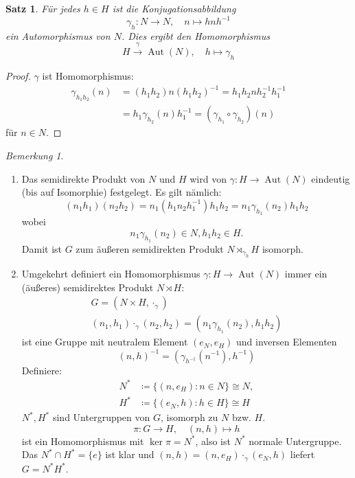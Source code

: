 \documentclass[12pt]{scrartcl} %
\DeclareMathOperator{\Aut}{Aut}
\newcommand{\inv}[1]{\left(#1\right)^{-1}}
\newcommand{\Inv}[1]{#1^{-1}}
\newtheorem{thm}{Satz}[section]
\theoremstyle{definition}
\theoremstyle{remark}
\newtheorem*{nb}{Bemerkung}
\begin{document}
\begin{thm}
	Für jedes $h\in H$ ist die Konjugationsabbildung $$\gamma_h: N\to N, \quad n\mapsto hn\Inv{h}$$ ein Automorphismus von $N$.
	Dies ergibt den Homomorphismus $$H\overset{\gamma}{\longrightarrow} \Aut(N), \quad h\mapsto \gamma_h$$
\end{thm}

\begin{proof}
	$\gamma$ ist Homomorphismus:
	\begin{align*}
		\gamma_{h_1h_2}(n)&=(h_1h_2)n\inv{h_1h_2}=h_1h_2n\Inv{h_2}\Inv{h_1} \\
		&= h_1\gamma_{h_2}(n)\Inv{h_1}=(\gamma_{h_1}\circ\gamma_{h_2})(n)
	\end{align*}
	für $n\in N$.
\end{proof}

\begin{nb}
	\begin{enumerate}[label=(\arabic*)]
	\item Das semidirekte Produkt von $N$ und $H$ wird von $\gamma: H\to \Aut(N)$ eindeutig (bis auf Isomorphie) festgelegt.
		Es gilt nämlich: $$(n_1h_1)(n_2h_2)=n_1(h_1n_2\Inv{h_1})h_1h_2=n_1\gamma_{h_1}(n_2)h_1h_2$$ wobei $$n_1\gamma_{h_1}(n_2)\in N, h_1h_2\in H.$$
                Damit ist $G$ zum äußeren semidirekten Produkt $N \rtimes_{\gamma_h} H$ isomorph.
	\item Umgekehrt definiert ein Homomorphismus $\gamma: H\to\Aut(N)$ immer ein (äußeres) semidirektes Produkt $N\rtimes H$:
		\begin{gather*}
			G=(N\times H, \cdot_\gamma) \\
			(n_1,h_1)\cdot_\gamma (n_2,h_2)=(n_1\gamma_{h_1}(n_2), h_1h_2)
		\end{gather*}
		ist eine Gruppe mit neutralem Element $(e_N, e_H)$ und inversen Elementen $$\Inv{(n,h)}=(\gamma_{\Inv{h}}(\Inv{n}),\Inv{h})$$
		Definiere:
		\begin{align*}
			N^*&\coloneqq \{(n, e_H): n\in N\} \cong N, \\
			H^*&\coloneqq \{(e_N, h): h\in H\} \cong H
		\end{align*}
		$N^*,H^*$ sind Untergruppen von $G$, isomorph zu $N$ bzw. $H$.
		$$\pi: G\longrightarrow H, \quad (n,h)\mapsto h$$ ist ein Homomorphismus mit $\ker \pi = N^*$, also ist $N^*$ normale Untergruppe.
		Das $N^*\cap H^* = \{e\}$ ist klar und $(n,h)=(n,e_H)\cdot_\gamma (e_N, h)$ liefert $G=N^*H^*$.
	\end{enumerate}
\end{nb}
\end{document}
